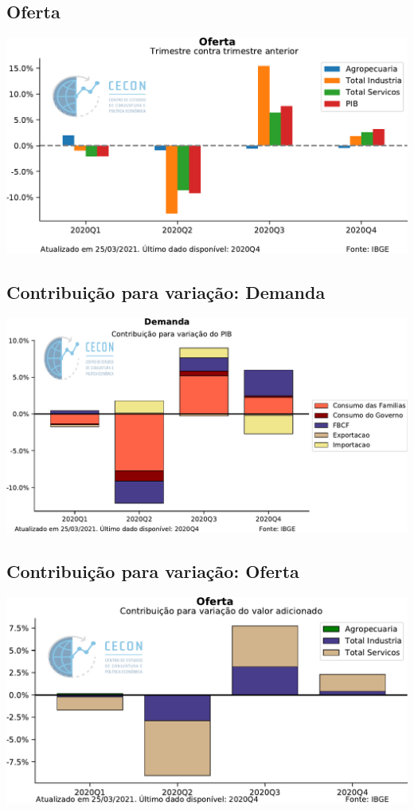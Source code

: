 \documentclass{SelfArx}
\begin{document}
\subsection*{Oferta}
\label{sec:org8f5f178}


\begin{center}
\includegraphics[width=.9\linewidth]{./figs/PIB/Oferta.pdf}
\end{center}


\subsection*{Contribuição para variação: Demanda}
\label{sec:orgbc35319}

\begin{center}
\includegraphics[width=.9\linewidth]{./figs/PIB/Contrib_Demanda.pdf}
\end{center}

\subsection*{Contribuição para variação: Oferta}
\label{sec:orgd9181b4}

\begin{center}
\includegraphics[width=.9\linewidth]{./figs/PIB/Contrib_Oferta.pdf}
\end{center}
\end{document}
